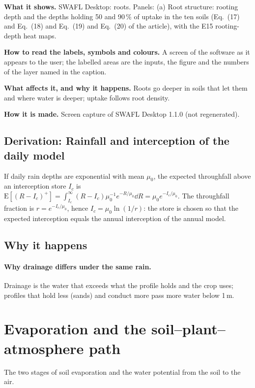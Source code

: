 \textbf{What it shows.} SWAFL Desktop: roots. Panels: (a) Root structure: rooting depth and the depths holding 50 and 90\,\% of uptake in the ten soils (Eq.~(17) and Eq.~(18) and Eq.~(19) and Eq.~(20) of the article), with the E15 rooting-depth heat maps.

\textbf{How to read the labels, symbols and colours.} A screen of the software as it appears to the user; the labelled areas are the inputs, the figure and the numbers of the layer named in the caption.

\textbf{What affects it, and why it happens.} Roots go deeper in soils that let them and where water is deeper; uptake follows root density. 

\textbf{How it is made.} Screen capture of SWAFL Desktop 1.1.0 (not regenerated).


\subsection{Derivation: Rainfall and interception of the daily model}\label{der:s2:8}
If daily rain depths are exponential with mean $\mu_0$, the expected throughfall above an interception store $I_c$ is $\mathrm E[(R-I_c)^+]=\int_{I_c}^\infty(R-I_c)\mu_0^{-1}e^{-R/\mu_0}\dd R=\mu_0e^{-I_c/\mu_0}$. The throughfall fraction is $r=e^{-I_c/\mu_0}$, hence $I_c=\mu_0\ln(1/r)$: the store is chosen so that the expected interception equals the annual interception of the annual model.


\subsection{Why it happens}
\paragraph{Why drainage differs under the same rain.} Drainage is the water that exceeds what the profile holds and the crop uses; profiles that hold less (sands) and conduct more pass more water below 1\,m.

\section{Evaporation and the soil--plant--atmosphere path}
The two stages of soil evaporation and the water potential from the soil to the air.

